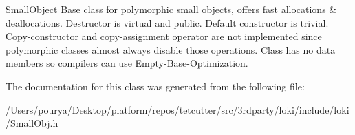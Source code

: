 \hyperlink{classLoki_1_1SmallObject}{Small\+Object} \hyperlink{structBase}{Base} class for polymorphic small objects, offers fast allocations \& deallocations. Destructor is virtual and public. Default constructor is trivial. Copy-\/constructor and copy-\/assignment operator are not implemented since polymorphic classes almost always disable those operations. Class has no data members so compilers can use Empty-\/\+Base-\/\+Optimization. 

The documentation for this class was generated from the following file\+:\begin{DoxyCompactItemize}
\item 
/\+Users/pourya/\+Desktop/platform/repos/tetcutter/src/3rdparty/loki/include/loki/Small\+Obj.\+h\end{DoxyCompactItemize}
